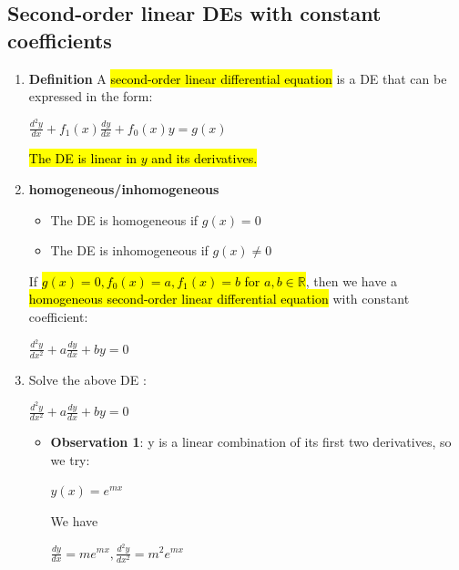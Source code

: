 \documentclass{article}
\begin{document}
    \subsection{Second-order linear DEs with constant coefficients}
      \begin{enumerate}
        \item \textbf{Definition} A \hl{second-order linear differential equation} is a DE that can be expressed in the form:
        \begin{center}
          $\frac{d^2y}{dx} + f_1(x)\frac{dy}{dx} + f_0(x)y = g(x)$
        \end{center}

        \hl{The DE is linear in $y$ and its derivatives.}

        \item \textbf{homogeneous/inhomogeneous}
            \begin{itemize}
              \item The DE is homogeneous if $g(x) = 0$
              \item The DE is inhomogeneous if $g(x) \neq 0$
            \end{itemize}

        If \hl{$g(x) = 0,f_0(x) = a, f_1(x) = b$ for $a,b \in \mathbb{R}$}, then we have a \hl{homogeneous second-order linear differential equation} with constant coefficient:

        \begin{center}
          $\frac{d^2 y}{dx^2} + a \frac{dy}{dx} + by = 0$
        \end{center}

        \item Solve the above DE : 
        \begin{center}
          $\frac{d^2 y}{dx^2} + a \frac{dy}{dx} + by = 0$
        \end{center}

        
        \begin{itemize}
          \item \textbf{Observation 1}: y is a linear combination of its first two derivatives, so we try:
          \begin{center}
            $y(x) = e^{mx}$
          \end{center} 

          We have

          \begin{center}
            $\frac{dy}{dx} = me^{mx}, \frac{d^2y}{dx^2} = m^2e^{mx}$
          \end{center} 


\end{itemize}
\end{enumerate}
\end{document}
